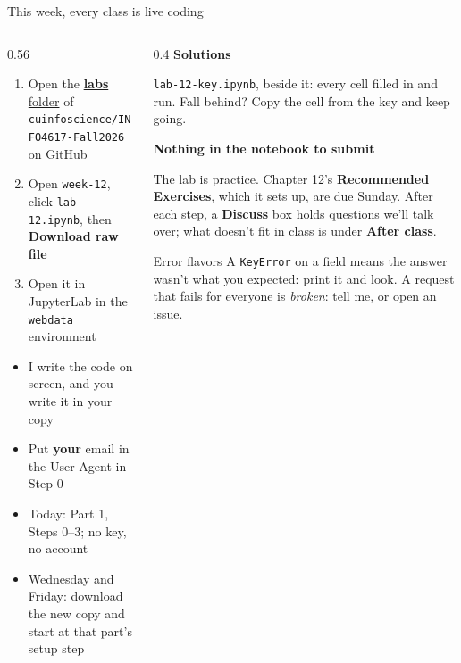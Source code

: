 \documentclass[9pt,aspectratio=169]{beamer}
\begin{document}
\begin{frame}{This week, every class is live coding}
    \begin{columns}[T]
        \begin{column}{0.56\textwidth}
            \begin{enumerate}\small
                \item Open the \href{https://github.com/cuinfoscience/INFO4617-Fall2026/tree/main/labs}{\textbf{labs} folder} of \texttt{cuinfoscience/INFO4617-Fall2026} on GitHub
                \item Open \texttt{week-12}, click \texttt{lab-12.ipynb}, then \textbf{Download raw file}
                \item Open it in JupyterLab in the \texttt{webdata} environment
            \end{enumerate}

            \medskip
            \begin{itemize}\small
                \item I write the code on screen, and you write it in your copy
                \item Put \textbf{your} email in the User-Agent in Step 0
                \item Today: Part 1, Steps 0--3; no key, no account
                \item Wednesday and Friday: download the new copy and start at that part's setup step
            \end{itemize}
        \end{column}
        \begin{column}{0.4\textwidth}
            \textbf{Solutions}\\[2pt]
            {\footnotesize \texttt{lab-12-key.ipynb}, beside it: every cell filled in and run. Fall behind? Copy the cell from the key and keep going.\par}
            \medskip
            \textbf{Nothing in the notebook to submit}\\[2pt]
            {\footnotesize The lab is practice. Chapter 12's \textbf{Recommended Exercises}, which it sets up, are due Sunday. After each step, a \textbf{Discuss} box holds questions we'll talk over; what doesn't fit in class is under \textbf{After class}.\par}
            \medskip
            \begin{alertblock}{Error flavors}
                \footnotesize A \texttt{KeyError} on a field means the answer wasn't what you expected: print it and look. A request that fails for everyone is \textit{broken}: tell me, or open an issue.
            \end{alertblock}
        \end{column}
    \end{columns}
\end{frame}
\end{document}
